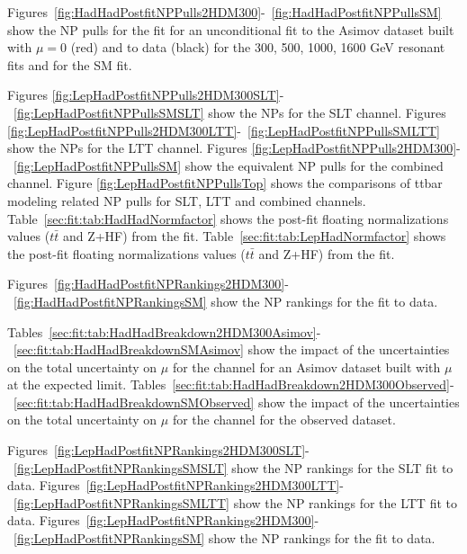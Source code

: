 Figures~\ref{fig:HadHadPostfitNPPulls2HDM300}-~\ref{fig:HadHadPostfitNPPullsSM} show the NP pulls for the \hadhad fit for an unconditional fit to the Asimov dataset built with $\mu=0$ (red) and to data (black) for the 300, 500, 1000, 1600 GeV resonant fits and for the SM fit. 

Figures \ref{fig:LepHadPostfitNPPulls2HDM300SLT}-~\ref{fig:LepHadPostfitNPPullsSMSLT} show the NPs for
the \lephad SLT channel.
Figures \ref{fig:LepHadPostfitNPPulls2HDM300LTT}-~\ref{fig:LepHadPostfitNPPullsSMLTT} show the NPs for
the \lephad LTT channel.
Figures \ref{fig:LepHadPostfitNPPulls2HDM300}-~\ref{fig:LepHadPostfitNPPullsSM} show the equivalent NP pulls for the combined \lephad channel.
Figure \ref{fig:LepHadPostfitNPPullsTop} shows the comparisons of ttbar modeling related NP pulls for 
\lephad SLT, LTT and combined channels.
Table~\ref{sec:fit:tab:HadHadNormfactor} shows the post-fit floating normalizations values ($t\bar{t}$ and Z+HF) from the \hadhad fit. Table~\ref{sec:fit:tab:LepHadNormfactor} shows the post-fit floating normalizations values ($t\bar{t}$ and Z+HF) from the \lephad fit.


Figures~\ref{fig:HadHadPostfitNPRankings2HDM300}-~\ref{fig:HadHadPostfitNPRankingsSM} show the NP rankings for the \hadhad fit to data. 

Tables~\ref{sec:fit:tab:HadHadBreakdown2HDM300Asimov}-~\ref{sec:fit:tab:HadHadBreakdownSMAsimov} show the impact of the uncertainties on the total uncertainty on $\mu$ for the \hadhad channel for an Asimov dataset built with $\mu$ at the expected limit. Tables~\ref{sec:fit:tab:HadHadBreakdown2HDM300Observed}-~\ref{sec:fit:tab:HadHadBreakdownSMObserved} show the impact of the uncertainties on the total uncertainty on $\mu$ for the \hadhad channel for the observed dataset.

Figures~\ref{fig:LepHadPostfitNPRankings2HDM300SLT}-~\ref{fig:LepHadPostfitNPRankingsSMSLT} show the NP rankings for the \lephad SLT fit to data.
Figures~\ref{fig:LepHadPostfitNPRankings2HDM300LTT}-~\ref{fig:LepHadPostfitNPRankingsSMLTT} show the NP rankings for the \lephad LTT fit to data.
Figures~\ref{fig:LepHadPostfitNPRankings2HDM300}-~\ref{fig:LepHadPostfitNPRankingsSM} show the NP rankings for the \lephad fit to data.

